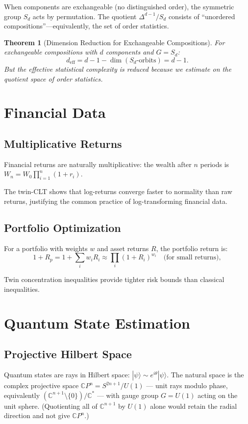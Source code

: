 \documentclass[11pt,twoside,openright]{book}
\theoremstyle{plain}
\newtheorem{theorem}{Theorem}[chapter]
\theoremstyle{definition}
\theoremstyle{remark}
\newcommand{\Cp}{\mathbb{C}}
\newcommand{\deff}{d_{\mathrm{eff}}}
\begin{document}
When components are exchangeable (no distinguished order), the symmetric group $S_d$ acts by permutation. The quotient $\Delta^{d-1}/S_d$ consists of ``unordered compositions''---equivalently, the set of order statistics.

\begin{theorem}[Dimension Reduction for Exchangeable Compositions]
For exchangeable compositions with $d$ components and $G = S_d$:
\[
\deff = d - 1 - \dim(S_d \text{-orbits}) = d - 1.
\]
But the effective statistical complexity is reduced because we estimate on the quotient space of order statistics.
\end{theorem}

\section{Financial Data}

\subsection{Multiplicative Returns}

Financial returns are naturally multiplicative: the wealth after $n$ periods is $W_n = W_0 \prod_{i=1}^n (1 + r_i)$.

The twin-CLT shows that log-returns converge faster to normality than raw returns, justifying the common practice of log-transforming financial data.

\subsection{Portfolio Optimization}

For a portfolio with weights $w$ and asset returns $R$, the portfolio return is:
\[
1+R_p = 1+\sum_i w_i R_i \approx \prod_i (1 + R_i)^{w_i} \quad \text{(for small returns)},
\]

Twin concentration inequalities provide tighter risk bounds than classical inequalities.

\section{Quantum State Estimation}

\subsection{Projective Hilbert Space}

Quantum states are rays in Hilbert space: $|\psi\rangle \sim e^{i\theta}|\psi\rangle$. The natural space is the complex projective space $\Cp P^n = S^{2n+1}/U(1)$ --- unit rays modulo phase, equivalently $(\Cp^{n+1}\setminus\{0\})/\Cp^*$ --- with gauge group $G = U(1)$ acting on the unit sphere. (Quotienting all of $\Cp^{n+1}$ by $U(1)$ alone would retain the radial direction and not give $\Cp P^n$.)
\end{document}
